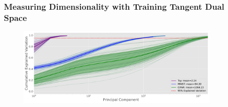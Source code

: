 \begin{frame}
  \frametitle{Measuring Dimensionality with Training Tangent Dual Space}
\begin{figure}[t]
    \centering
    \includegraphics[width=0.9\textwidth]{c4a_figures/dimensionality_chords.pdf}
\end{figure}
\end{frame} 





